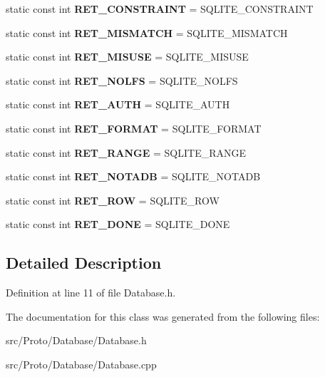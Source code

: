 \begin{DoxyCompactItemize}
\item 
\hypertarget{class_database_a12493e4a82057e9a71510546c1264084}{
static const int {\bfseries RET\_\-CONSTRAINT} = SQLITE\_\-CONSTRAINT}
\label{class_database_a12493e4a82057e9a71510546c1264084}

\item 
\hypertarget{class_database_a3e743a4be7781638c122df304796b567}{
static const int {\bfseries RET\_\-MISMATCH} = SQLITE\_\-MISMATCH}
\label{class_database_a3e743a4be7781638c122df304796b567}

\item 
\hypertarget{class_database_aaa1c8f2a6a8019bded318c1c5e387392}{
static const int {\bfseries RET\_\-MISUSE} = SQLITE\_\-MISUSE}
\label{class_database_aaa1c8f2a6a8019bded318c1c5e387392}

\item 
\hypertarget{class_database_a29876a9218eca89f8766bbc2c80c344c}{
static const int {\bfseries RET\_\-NOLFS} = SQLITE\_\-NOLFS}
\label{class_database_a29876a9218eca89f8766bbc2c80c344c}

\item 
\hypertarget{class_database_a2804df17df10798c0567631b93948045}{
static const int {\bfseries RET\_\-AUTH} = SQLITE\_\-AUTH}
\label{class_database_a2804df17df10798c0567631b93948045}

\item 
\hypertarget{class_database_af05a6bb43481d96c0e90eff664f60cb8}{
static const int {\bfseries RET\_\-FORMAT} = SQLITE\_\-FORMAT}
\label{class_database_af05a6bb43481d96c0e90eff664f60cb8}

\item 
\hypertarget{class_database_a02d9c6d2467efbb6a4d863e889070845}{
static const int {\bfseries RET\_\-RANGE} = SQLITE\_\-RANGE}
\label{class_database_a02d9c6d2467efbb6a4d863e889070845}

\item 
\hypertarget{class_database_a33b24214a439242ec0f7a7581601515a}{
static const int {\bfseries RET\_\-NOTADB} = SQLITE\_\-NOTADB}
\label{class_database_a33b24214a439242ec0f7a7581601515a}

\item 
\hypertarget{class_database_afd60440bc204450e31c36e0004e39cb8}{
static const int {\bfseries RET\_\-ROW} = SQLITE\_\-ROW}
\label{class_database_afd60440bc204450e31c36e0004e39cb8}

\item 
\hypertarget{class_database_ac00fd3b5a6171893812b2e69bd76d05b}{
static const int {\bfseries RET\_\-DONE} = SQLITE\_\-DONE}
\label{class_database_ac00fd3b5a6171893812b2e69bd76d05b}

\end{DoxyCompactItemize}


\subsection{Detailed Description}


Definition at line 11 of file Database.h.



The documentation for this class was generated from the following files:\begin{DoxyCompactItemize}
\item 
src/Proto/Database/Database.h\item 
src/Proto/Database/Database.cpp\end{DoxyCompactItemize}
